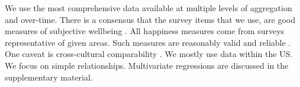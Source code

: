\documentclass[10pt, letterpaper]{article}
\begin{document}
\begin{spacing}{1.0}





We use the most comprehensive data available at multiple levels of aggregation
and over-time. There is a consensus that the survey items that we use, are good
measures of subjective wellbeing \citep{diener09,oswald09w,stiglitz09al}.
 All happiness measures come from surveys representative of given areas. Such measures are reasonably valid and
reliable \citep{diener13b}. %
One caveat is cross-cultural comparability \citep{diener03b}. %
 We mostly use data within the US. %
We focus on simple relationships. Multivariate regressions are
discussed in the supplementary material. 




\end{spacing}
\end{document}
